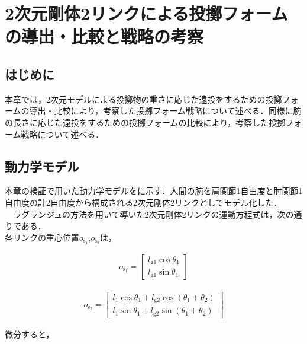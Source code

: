 \chapter[2次元剛体2リンクによる投擲フォームの導出・比較と戦略の考察]{2次元剛体2リンクによる投擲フォームの導出・比較と戦略の考察}

\section{はじめに}
本章では，2次元モデルによる投擲物の重さに応じた遠投をするための投擲フォームの導出・比較により，考察した投擲フォーム戦略について述べる．同様に腕の長さに応じた遠投をするための投擲フォームの比較により，考察した投擲フォーム戦略について述べる．
\section{動力学モデル}
本章の検証で用いた動力学モデルをに示す．人間の腕を肩関節1自由度と肘関節1自由度の計2自由度から構成される2次元剛体2リンクとしてモデル化した．\\
　ラグランジュの方法を用いて導いた2次元剛体2リンクの運動方程式は，次の通りである．\\
各リンクの重心位置$o_{\mathrm{s_{1}}}$,$o_{\mathrm{s_{2}}}$は，


\begin{eqnarray}
  o_{\mathrm{s_{1}}} = 
              \begin{bmatrix}
              l_{\mathrm{g1}}\cos\theta_{1}\\
              l_{\mathrm{g1}}\sin\theta_{1}
              \end{bmatrix}
\end{eqnarray}

\begin{eqnarray}
  o_{\mathrm{s_{2}}} = 
              \begin{bmatrix}
              l_{1}\cos\theta_{1} + l_{\mathrm{g2}}\cos(\theta_{1} + \theta_{2})\\
              l_{1}\sin\theta_{1} + l_{\mathrm{g2}}\sin(\theta_{1} + \theta_{2})
              \end{bmatrix}
\end{eqnarray}

微分すると，


